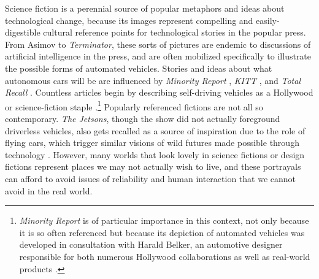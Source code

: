 

Science fiction is a perennial source of popular metaphors and ideas
about technological change, because its
images represent compelling and easily-digestible
cultural reference 
points for technological stories in the popular press. From Asimov to
\emph{Terminator}, 
these sorts of pictures are endemic to discussions of artificial
intelligence in the press, and are often mobilized specifically to
illustrate the possible forms of automated vehicles. Stories and ideas
about what autonomous cars will be are
influenced by \emph{Minority Report} \cite{fromHollywood}, \emph{KITT}
\cite{wadeKITT}, and \emph{Total
  Recall} \cite{pasdirtzSolution}. Countless articles begin by describing
self-driving vehicles as a Hollywood or science-fiction
staple \cite{scifiToReality}.\footnote{\emph{Minority Report} is of particular
importance in this context, not only because it is so often referenced
but because its depiction of automated vehicles was developed in
consultation with Harald Belker, an automotive designer responsible
for both numerous Hollywood collaborations as well as real-world
products \cite{melansonMinority}.} Popularly referenced fictions are
not all so contemporary. \emph{The Jetsons}, though
the show did not actually foreground driverless vehicles, also gets
recalled as a source of inspiration due to the role of flying cars,
which trigger similar visions of wild 
futures made possible through technology \cite{JetsonsAge}. However, many
worlds that look lovely in science fictions or design fictions represent places 
we may not actually wish to live, and these portrayals can afford to
avoid issues of reliability and human interaction that we cannot avoid
in the real world. 



